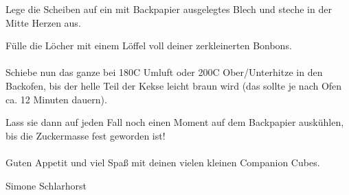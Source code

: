 {    Lege die Scheiben auf ein mit Backpapier ausgelegtes Blech
    und steche in der Mitte Herzen aus.

    Fülle die Löcher mit einem Löffel voll
    deiner zerkleinerten Bonbons.
    \\~\\
    Schiebe nun das ganze bei 180\textdegree{}C Umluft oder 200\textdegree{}C Ober/Unterhitze in den
    Backofen, bis der helle Teil der Kekse leicht braun wird (das sollte je nach
    Ofen ca. 12 Minuten dauern).

    Lass sie dann auf jeden Fall noch einen Moment auf
    dem Backpapier auskühlen, bis die Zuckermasse fest geworden ist!
    \\~\\
    Guten Appetit und viel Spaß mit deinen vielen kleinen Companion Cubes.
}
{Simone Schlarhorst}
